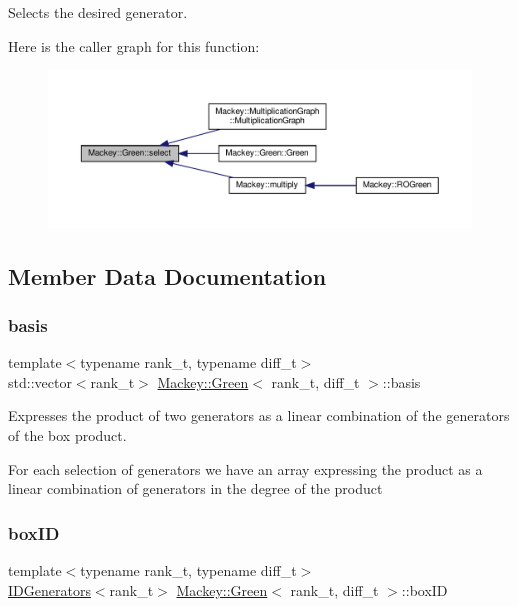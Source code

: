 Selects the desired generator. 

Here is the caller graph for this function\+:\nopagebreak
\begin{figure}[H]
\begin{center}
\leavevmode
\includegraphics[width=350pt]{classMackey_1_1Green_a094a394ff8e1f4801fb3a5f09e071def_icgraph}
\end{center}
\end{figure}


\subsection{Member Data Documentation}
\mbox{\label{classMackey_1_1Green_a9cfc633ccb548d2d516450399c108174}} 
\subsubsection{\texorpdfstring{basis}{basis}}
{\footnotesize\ttfamily template$<$typename rank\+\_\+t, typename diff\+\_\+t$>$ \\
std\+::vector$<$rank\+\_\+t$>$ \hyperlink{classMackey_1_1Green}{Mackey\+::\+Green}$<$ rank\+\_\+t, diff\+\_\+t $>$\+::basis}



Expresses the product of two generators as a linear combination of the generators of the box product. 

For each selection of generators we have an array expressing the product as a linear combination of generators in the degree of the product \mbox{\label{classMackey_1_1Green_aea166896ebdaa17b3c5d21b2ae936e0d}} 
\subsubsection{\texorpdfstring{box\+ID}{boxID}}
{\footnotesize\ttfamily template$<$typename rank\+\_\+t, typename diff\+\_\+t$>$ \\
\hyperlink{classMackey_1_1IDGenerators}{I\+D\+Generators}$<$rank\+\_\+t$>$ \hyperlink{classMackey_1_1Green}{Mackey\+::\+Green}$<$ rank\+\_\+t, diff\+\_\+t $>$\+::box\+ID}



